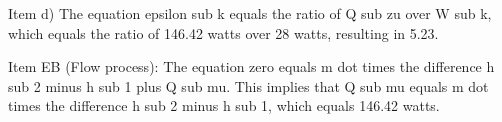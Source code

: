 Item d) The equation epsilon sub k equals the ratio of Q sub zu over W sub k, which equals the ratio of 146.42 watts over 28 watts, resulting in 5.23.

Item EB (Flow process): The equation zero equals m dot times the difference h sub 2 minus h sub 1 plus Q sub mu. This implies that Q sub mu equals m dot times the difference h sub 2 minus h sub 1, which equals 146.42 watts.